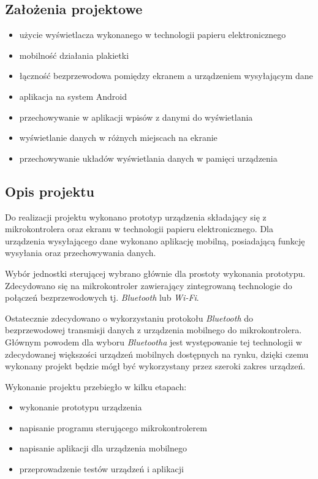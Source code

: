 \documentclass[a4paper,12pt, twoside]{article}
\begin{document}
	\subsection{Założenia projektowe}
	\begin{itemize}
		\item użycie wyświetlacza wykonanego w technologii papieru elektronicznego
		\item mobilność działania plakietki 
		\item łączność bezprzewodowa pomiędzy ekranem a urządzeniem wysyłającym dane
		\item aplikacja na system Android
		\item przechowywanie w aplikacji wpisów z danymi do wyświetlania
		\item wyświetlanie danych w różnych miejscach na ekranie 
		\item przechowywanie układów wyświetlania danych w pamięci urządzenia
	\end{itemize}
	\newpage
	
	\subsection{Opis projektu}
	Do realizacji projektu wykonano prototyp urządzenia składający się z mikrokontrolera oraz ekranu w technologii papieru elektronicznego. Dla urządzenia wysyłającego dane wykonano aplikację mobilną, posiadającą funkcję wysyłania oraz przechowywania danych. 
	
	Wybór jednostki sterującej wybrano głównie dla prostoty wykonania prototypu. Zdecydowano się na mikrokontroler zawierający zintegrowaną technologie do połączeń bezprzewodowych tj. \textit{Bluetooth}\cite{bluetooth} lub \textit{Wi-Fi}\cite{wifi}. 
	
	Ostatecznie zdecydowano o wykorzystaniu protokołu \textit{Bluetooth} do bezprzewodowej transmisji danych z urządzenia mobilnego do mikrokontrolera. Głównym powodem dla wyboru \textit{Bluetootha} jest występowanie tej technologii w zdecydowanej większości urządzeń mobilnych dostępnych na rynku, dzięki czemu wykonany projekt będzie mógł być wykorzystany przez szeroki zakres urządzeń.
	
	\begin{flushleft}
	Wykonanie projektu przebiegło w kilku etapach:
	\begin{itemize}
	    \item wykonanie prototypu urządzenia
	    \item napisanie programu sterującego mikrokontrolerem
	    \item napisanie aplikacji dla urządzenia mobilnego
	    \item przeprowadzenie testów urządzeń i aplikacji
	\end{itemize}
	\end{flushleft}
	\newpage
\end{document}
